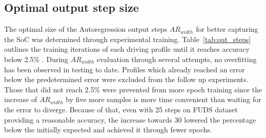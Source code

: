\subsection{Optimal output step size}
    The optimal size of the Autoregression output steps $AR_{width}$ for better capturing the SoC was determined through experimental training.
    \mbox{Table~\ref{tab:out_steps}} outlines the training iterations of each driving profile until it reaches accuracy below 2.5\%
     {.}
    During $AR_{width}$ evaluation through several attempts, no overfitting has been observed in testing to date.
    Profiles which already reached an error below the predetermined error were excluded from the follow up experiments.
    Those that did not reach 2.5\% were prevented from more epoch training since the increase of $AR_{width}$ by five more samples is more time convenient than waiting for the error to diverge.
    Because of that, even with 25 steps on FUDS dataset providing a reasonable accuracy, the increase towards 30 lowered the percentage below the initially expected and achieved it through fewer epochs.
